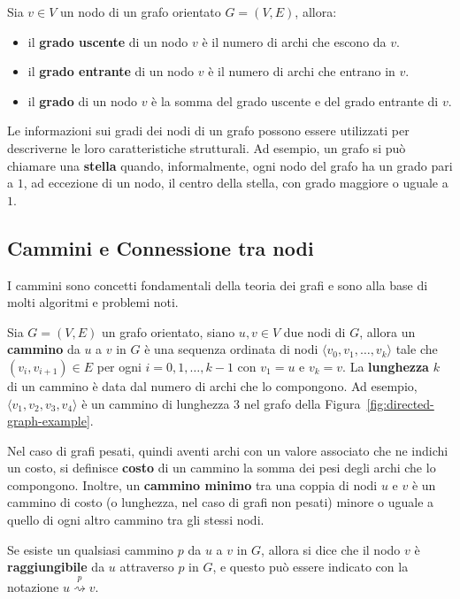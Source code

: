 Sia $v \in V$ un nodo di un grafo orientato $G = (V, E)$, allora:
\begin{itemize}
    \item il \textbf{grado uscente} di un nodo $v$ \`e il numero di archi che escono da $v$.
    \item il \textbf{grado entrante} di un nodo $v$ \`e il numero di archi che entrano in $v$.
    \item il \textbf{grado} di un nodo $v$ \`e la somma del grado uscente e del grado entrante di $v$.
\end{itemize}

Le informazioni sui gradi dei nodi di un grafo possono essere utilizzati per descriverne le loro caratteristiche
strutturali.
Ad esempio, un grafo si può chiamare una \textbf{stella} quando, informalmente, ogni nodo del grafo ha un
grado pari a $1$, ad eccezione di un nodo, il centro della stella, con grado maggiore o uguale a $1$.

\subsection{Cammini e Connessione tra nodi}\label{subsec:cammini}


I cammini sono concetti fondamentali della teoria dei grafi e sono alla base di molti algoritmi e problemi noti. \newline

Sia $G = (V, E)$ un grafo orientato, siano $u, v \in V$ due nodi di $G$, allora un \textbf{cammino} da $u$ a $v$ in $G$
\`e una sequenza ordinata di nodi $\langle v_0, v_1, \ldots, v_k \rangle$ tale che $(v_i, v_{i+1}) \in E$ per ogni
$i = 0, 1, \ldots, k-1$ con $v_1 = u$ e $v_k = v$.
La \textbf{lunghezza} $k$ di un cammino \`e data dal numero di archi che lo compongono.
Ad esempio, $\langle v_1, v_2, v_3, v_4 \rangle$ \`e un cammino di lunghezza $3$ nel grafo della
Figura~\ref{fig:directed-graph-example}.

Nel caso di grafi pesati, quindi aventi archi con un valore associato che ne indichi un costo, si definisce
\textbf{costo} di un cammino la somma dei pesi degli archi che lo compongono.
Inoltre, un \textbf{cammino minimo} tra una coppia di nodi $u$ e $v$ è un cammino di costo (o lunghezza, nel caso
di grafi non pesati) minore o uguale a quello di ogni altro cammino tra gli stessi nodi.

Se esiste un qualsiasi cammino $p$ da $u$ a $v$ in $G$, allora si dice che il nodo $v$ \`e \textbf{raggiungibile} da
$u$ attraverso $p$ in $G$, e questo pu\`o essere indicato con la notazione $u \overset{p}{\rightsquigarrow} v$. \newline

